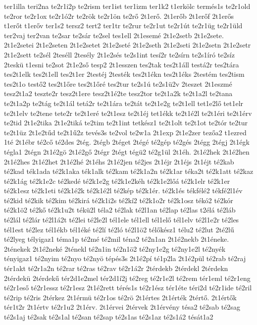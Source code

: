 {ter1illa
teri2na
te2r1i2p
te2rism
ter1ist
ter1izm
ter1k2
t1erkölc
termés1s
te2r1old
te2ror
te2r1ox
te2r1ó2r
te2rök
te2r1ön
te2rő
2t1erő.
2t1erőb
2t1erőf
2t1erős
t1erőt
t1erőv
ter1s2
tersz2
tert2
ter1tr
te2rur
te2r1ut
te2r1út
te2r1üg
te2r1üld
ter2vaj
ter2van
te2sar
te2sár
te2sel
tes1ell
2t1esemé
2t1e2setb
2t1e2sete.
2t1e2setei
2t1e2seten
2t1e2setet
2t1e2seté
2t1e2seth
2t1e2seti
2t1e2setn
2t1e2setr
2t1e2sett
te2sél
2teséll
2tesély
2t1e2sés
te2s1int
tesí2r
te2sírn
te2s1író
te2síz
2teskü
t1esni
te2sot
2t1e2ső
tesp2
2t1esszen
tes2tak
tes2t1áll
testá2r
tes2tára
tes2t1elk
tes2t1ell
tes2t1er
2testéj
2testék
tes2t1ékn
tes2t1éks
2testém
tes2tism
tes2t1o
testő2
tes2t1őre
tes2t1őré
tes2tur
te2s1ú
te2s1ü2v
2teszet
2t1eszmé
tesz2t1a2
teszte2r
tesz2t1ere
tesz2t1é2te
tesz2tor
te2t1a2k
te2t1a2l
te2tana
te2t1a2p
te2tág
te2t1ál
tetá2r
te2t1ára
te2tát
te2t1e2g
te2t1ell
tet1e2lő
tet1elr
te2t1elv
te2tene
tete2r
te2t1eré
te2t1esz
te2t1éj
tet1ékk
te2t1é2l
te2t1éri
te2t1érv
te2tid
2t1e2tika
2t1e2tiká
te2tim
te2t1int
tetkész1
te2t1olt
te2t1ot
te2tór
te2tur
te2t1üz
2t1e2tűd
te2t1ű2z
tevés3s
te2vol
te2w1a
2t1exp
2t1e2zer
tezőa2
t1ezred
1té
2t1ébr
té2cő
té2des
2tég.
2tégb
2téget
2tégé
té2gép
té2gés
2tégg
2tégj
2t1égk
tégla1
2tégn
2t1é2gö
2t1é2gő
2tégr
2tégt
tégü2
té2g1ül
2t1éh.
2t1é2hek
2t1é2hen
2t1é2hes
2t1é2het
2t1é2hé
2t1éhs
2t1é2jen
té2jes
2t1éjr
2t1éjs
2t1éjt
té2kab
té2kad
ték1ada
té2k1aka
ték1alk
té2kam
té2k1a2n
té2k1ar
téka2t
té2k1att
té2kaz
té2k1ág
té2k1e2c
té2kedé
té2k1e2g
té2k1e2kéh
té2k1e2lőá
té2k1elr
té2k1er
té2k1esz
té2k1eti
té2k1é2k
té2k1é2l
té2kép
té2k1ér.
té2k1és
tékfélé2
tékfé2l1év
té2kid
té2kik
té2kim
té2kirá
té2k1i2s
té2kí2
té2k1o2r
té2k1osz
tékó2
té2kór
té2k1ö2
té2kő
té2k1u2t
tékü2l
téla2
té2lak
té2l1an
té2lap
té2las
t2élá
té2láb
té2lál
té2lár
té2l1á2t
té2lei
té2le2l
tél1ele
tél1ell
tél1elő
tél1elv
té2l1e2r
té2les
tél1est
té2lez
tél1ékb
tél1éké
té2lí
té2ló
té2l1ö2
télőkész1
télu2
té2lut
2té2lű
té2lyeg
télyigaz1
téma1p
té2mé
té2mil
téna2
té2n1an
2t1é2nekb
2t1éneke.
2ténekek
2t1é2neké
2ténekl
té2n1in
té2n1ö2
té2ny1e2g
té2ny1e2l
té2nyék
tényigaz1
té2nyim
té2nyo
té2nyö
tépés3s
2t1é2pí
té1p2la
2t1é2pül
té2rab
té2raj
tér1akt
té2r1a2n
té2rar
té2ras
té2rav
té2r1á2r
2térdekb
2térdekl
2térdekn
2térdekü
2térdekű
tér2d1e2mel
tér2d1í2j
té2reg
té2r1e2l
té2rem
tér1eml
té2r1eng
té2r1eső
té2r1essz
té2r1esz
2t1é2rett
térés1s
té2r1ész
tér1éte
téri2d
té2r1ide
té2ril
té2rip
té2ris
2térkez
2t1érmü
té2r1os
té2rö
2t1értes
2t1érték
2tértő.
2t1értők
tér1t2r
2t1értv
té2r1u2
2t1érv.
2t1érvei
2térvek
2t1érvény
tésa2
té2sab
té2sag
té2s1aj
té2sak
té2s1al
té2san
té2sap
té2s1as
té2s1az
té2s1á2
tésát1a2
}
